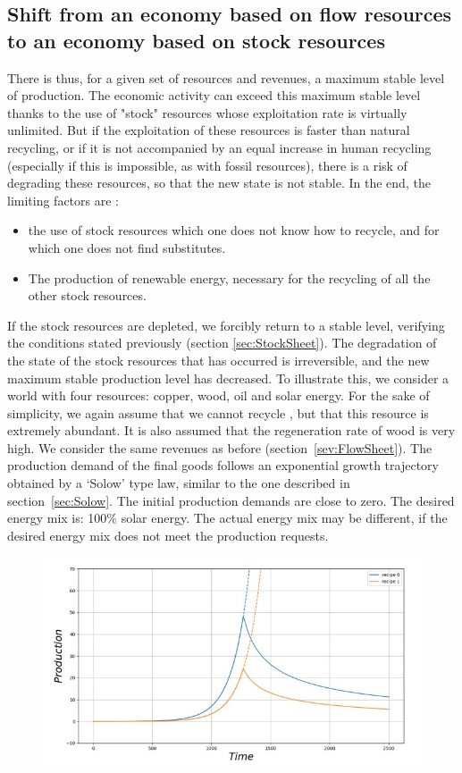 \documentclass[12pt,a4paper]{article}%
\begin{document}
\begin{appendix}
\subsection{Shift from an economy based on flow resources to an economy based on stock resources} 
There is thus, for a given set of resources and revenues, a maximum stable level of production. The economic activity can exceed this maximum stable level thanks to the use of "stock" resources whose exploitation rate is virtually unlimited. But if the exploitation of these resources is faster than natural recycling, or if it is not accompanied by an equal increase in human recycling (especially if this is impossible, as with fossil resources), there is a risk of degrading these resources, so that the new state is not stable.  In the end, the limiting factors are :  
\begin{itemize}
	\item the use of stock resources which one does not know how to recycle, and for which one does not find substitutes.  
	\item The production of renewable energy, necessary for the recycling of all the other stock resources. 
\end{itemize} If the stock resources are depleted, we forcibly return to a stable level, verifying the conditions stated previously (section \ref{sec:StockSheet}). The degradation of the state of the stock resources that has occurred is irreversible, and the new maximum stable production level has decreased.  To illustrate this, we consider a world with four resources: copper, wood, oil and solar energy. For the sake of simplicity, we again assume that we cannot recycle , but that this resource is extremely abundant. It is also assumed that the regeneration rate of wood is very high.  We consider the same revenues as before (section~\ref{sev:FlowSheet}). The production demand of the final goods follows an exponential growth trajectory obtained by a `Solow' type law, similar to the one described in section~\ref{sec:Solow}. The initial production demands are close to zero.  The desired energy mix is: 100\% solar energy. The actual energy mix may be different, if the desired energy mix does not meet the production requests.  
\begin{figure}[h] 
	\centering \includegraphics[width=1.0\textwidth]{figures/Production11.jpg}

\end{figure}
\end{appendix}
\end{document}
